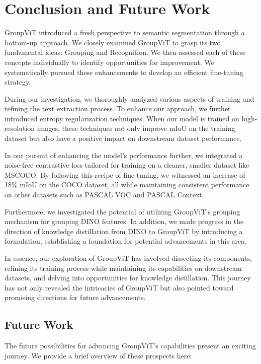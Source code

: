 \chapter{Conclusion and Future Work}\label{chap:conclusion}

GroupViT introduced a fresh perspective to semantic segmentation through a bottom-up approach. We closely examined GroupViT to grasp its two fundamental ideas: Grouping and Recognition. We then assessed each of these concepts individually to identify opportunities for improvement. We systematically pursued these enhancements to develop an efficient fine-tuning strategy.


During our investigation, we thoroughly analyzed various aspects of training and refining the text extraction process. To enhance our approach, we further introduced entropy regularization techniques. When our model is trained on high-resolution images, these techniques not only improve mIoU on the training dataset but also have a positive impact on downstream dataset performance.

In our pursuit of enhancing the model's performance further, we integrated a noise-free contrastive loss tailored for training on a cleaner, smaller dataset like MSCOCO. By following this recipe of fine-tuning, we witnessed an increase of  18\% mIoU on the COCO dataset, all while maintaining consistent performance on other datasets such as PASCAL VOC and PASCAL Context.

Furthermore, we investigated the potential of utilizing GroupViT's grouping mechanism for grouping DINO features. In addition, we made progress in the direction of knowledge distillation from DINO to GroupViT by introducing a formulation, establishing a foundation for potential advancements in this area.

In essence, our exploration of GroupViT has involved dissecting its components, refining its training process while maintaining its capabilities on downstream datasets, and delving into opportunities for knowledge distillation. This journey has not only revealed the intricacies of GroupViT but also pointed toward promising directions for future advancements.
\section{Future Work}

The future possibilities for advancing GroupViT's capabilities present an exciting journey. We provide a brief overview of these prospects here:

